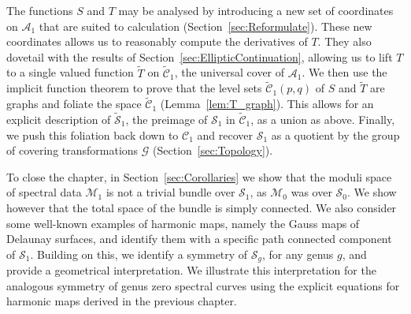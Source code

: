 The functions $S$ and $T$ may be analysed by introducing a new set of coordinates on $\mathcal{A}_1$ that are suited to calculation (Section~\ref{sec:Reformulate}).
These new coordinates allows us to reasonably compute the derivatives of $T$. They also dovetail with the results of Section~\ref{sec:EllipticContinuation}, allowing us to lift $T$ to a  single valued function $\tilde{T}$ on $\mathcal{\tilde{C}}_1$, the universal cover of $\mathcal{A}_1$.
We then use the implicit function theorem to prove that the level sets $\mathcal{\tilde{C}}_1(p,q)$ of $S$ and $\tilde{T}$ are graphs and foliate the space $\mathcal{\tilde{C}}_1$ (Lemma~\ref{lem:T_graph}). This allows for an explicit description of $\mathcal{\tilde{S}}_1$, the preimage of $\mathcal{S}_1$ in $\mathcal{\tilde{C}}_1$, as a union as above.
Finally, we push this foliation back down to $\mathcal{C}_1$ and recover $\mathcal{S}_1$ as a quotient by the group of covering transformations $\mathcal{G}$ (Section~\ref{sec:Topology}).

To close the chapter, in Section~\ref{sec:Corollaries} we show that the moduli space of spectral data $\mathcal{M}_1$ is not a trivial bundle over $\mathcal{S}_1$, as $\mathcal{M}_0$ was over $\mathcal{S}_0$. We show however that the total space of the bundle is simply connected. We also consider some well-known examples of harmonic maps, namely the Gauss maps of Delaunay surfaces, and identify them with a specific path connected component of $\mathcal{S}_1$. Building on this, we identify a symmetry of $\mathcal{S}_g$, for any genus $g$, and provide a geometrical interpretation. We illustrate this interpretation for the analogous symmetry of genus zero spectral curves using the explicit equations for harmonic maps derived in the previous chapter.


